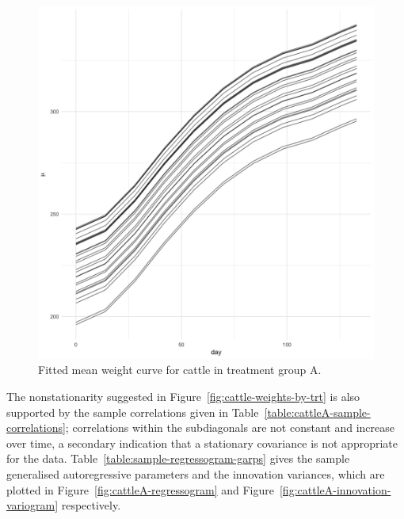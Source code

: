 \begin{figure}[H] 
\caption{Fitted mean weight curve for cattle in treatment group A. }
\begin{center}
\includegraphics[width = \textwidth]{img/cattle/cattleA-weights-vs-time-mean-fit}
\end{center}\label{fig:cattleA-smoothed-weights-vs-time}
\end{figure} 

The nonstationarity suggested in Figure~\ref{fig:cattle-weights-by-trt} is also supported by the sample correlations given in Table~\ref{table:cattleA-sample-correlations}; correlations within the subdiagonals are not constant and increase over time, a secondary indication that a stationary covariance is not appropriate for the data.  Table~\ref{table:sample-regressogram-garps} gives the sample generalised autoregressive parameters and the innovation variances, which are plotted in Figure~\ref{fig:cattleA-regressogram} and Figure~\ref{fig:cattleA-innovation-variogram} respectively. 

